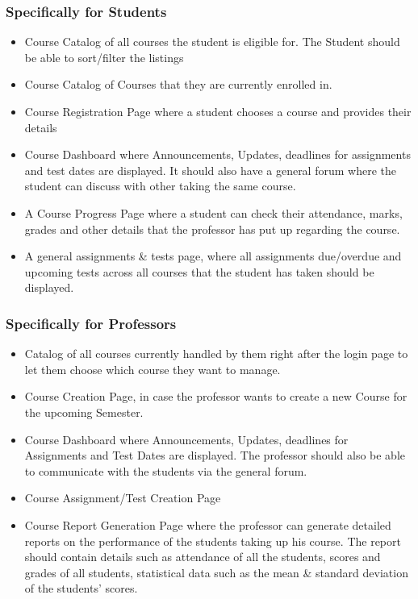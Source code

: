 \documentclass[12pt, a4]{article}
\begin{document}
\subsubsection{Specifically for Students}
\begin{itemize}
    \item Course Catalog  of all courses the student is eligible for. The Student should be able to sort/filter the listings
    \item Course Catalog of Courses that they are currently enrolled in.
    \item Course Registration Page where a student chooses a course and provides their details
    \item Course Dashboard where Announcements, Updates, deadlines for assignments and test dates are displayed. It should also have a general forum where the student can discuss with other taking the same course.
    \item A Course Progress Page where a student can check their attendance, marks, grades and other details that the professor has put up regarding the course.
    \item A general assignments \& tests page, where all assignments due/overdue and upcoming tests across all courses that the student has taken should be displayed.
\end{itemize}

\subsubsection{Specifically for Professors}
\begin{itemize}
    \item Catalog of all courses currently handled by them right after the login page to let them choose which course they want to manage.
    \item Course Creation Page, in case the professor wants to create a new Course for the upcoming Semester.
    \item Course Dashboard where Announcements, Updates, deadlines for Assignments and Test Dates are displayed. The professor should also be able to communicate with the students via the general forum.
    \item Course Assignment/Test Creation Page
    \item Course Report Generation Page where the professor can generate detailed reports on the performance of the students taking up his course. The report should contain details such as attendance of all the students, scores and grades of all students, statistical data such as the mean \& standard deviation of the students' scores.
\end{itemize}
\end{document}
